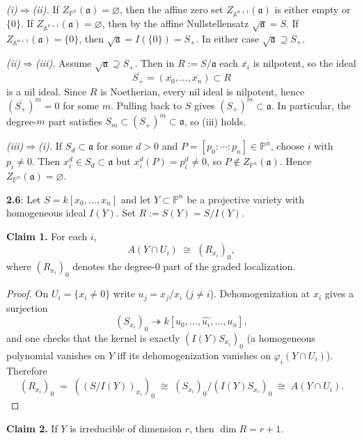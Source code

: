 \documentclass[12pt]{article}
\numberwithin{thm}{subsection}
\numberwithin{defn}{subsection}
\numberwithin{lemma}{subsection}
\numberwithin{example}{subsection}
\numberwithin{notation}{subsection}
\numberwithin{cor}{subsection}
\numberwithin{remark}{subsection}
\numberwithin{condition}{subsection}
\numberwithin{question}{subsection}
\numberwithin{construction}{subsection}
\numberwithin{construction}{subsection}
\numberwithin{construction}{subsection}
\begin{document}
\emph{(i)$\Rightarrow$(ii).}
If $Z_{\mathbb P^n}(\mathfrak a)=\varnothing$, then the affine zero set $Z_{\mathbb A^{n+1}}(\mathfrak a)$
is either empty or $\{0\}$.
If $Z_{\mathbb A^{n+1}}(\mathfrak a)=\varnothing$, then by the affine Nullstellensatz $\sqrt{\mathfrak a}=S$.
If $Z_{\mathbb A^{n+1}}(\mathfrak a)=\{0\}$, then $\sqrt{\mathfrak a}=I(\{0\})=S_+$.
In either case $\sqrt{\mathfrak a}\supseteq S_+$.

\emph{(ii)$\Rightarrow$(iii).}
Assume $\sqrt{\mathfrak a}\supseteq S_+$.
Then in $R:=S/\mathfrak a$ each $\overline{x_i}$ is nilpotent, so the ideal
\[
\overline{S_+}=(\overline{x_0},\dots,\overline{x_n})\subset R
\]
is a nil ideal.
Since $R$ is Noetherian, every nil ideal is nilpotent, hence $(\overline{S_+})^m=0$ for some $m$.
Pulling back to $S$ gives $(S_+)^m\subset \mathfrak a$.
In particular, the degree-$m$ part satisfies $S_m\subset (S_+)^m\subset \mathfrak a$, so (iii) holds.

\emph{(iii)$\Rightarrow$(i).}
If $S_d\subset \mathfrak a$ for some $d>0$ and $P=[p_0:\cdots:p_n]\in \mathbb P^n$,
choose $i$ with $p_i\neq 0$.
Then $x_i^d\in S_d\subset \mathfrak a$ but $x_i^d(P)=p_i^d\neq 0$, so $P\notin Z_{\mathbb P^n}(\mathfrak a)$.
Hence $Z_{\mathbb P^n}(\mathfrak a)=\varnothing$.


\bigskip

\textbf{2.6}:
Let $S=k[x_0,\dots,x_n]$ and let $Y\subset \mathbb P^n$ be a projective variety with homogeneous ideal $I(Y)$.
Set $R:=S(Y)=S/I(Y)$.

\medskip
\textbf{Claim 1.} For each $i$,
\[
A(Y\cap U_i)\;\cong\; (R_{x_i})_0,
\]
where $(R_{x_i})_0$ denotes the degree-$0$ part of the graded localization.

\begin{proof}
On $U_i=\{x_i\neq 0\}$ write $u_j=x_j/x_i$ ($j\neq i$). Dehomogenization at $x_i$ gives a surjection
\[
(S_{x_i})_0 \twoheadrightarrow k[u_0,\dots,\widehat{u_i},\dots,u_n],
\]
and one checks that the kernel is exactly $(I(Y)S_{x_i})_0$ (a homogeneous polynomial vanishes on $Y$ iff its
dehomogenization vanishes on $\varphi_i(Y\cap U_i)$).
Therefore
\[
(R_{x_i})_0 \;=\; ((S/I(Y))_{x_i})_0 \;\cong\; (S_{x_i})_0/(I(Y)S_{x_i})_0 \;\cong\; A(Y\cap U_i).
\]
\end{proof}

\medskip
\textbf{Claim 2.} If $Y$ is irreducible of dimension $r$, then $\dim R=r+1$.
\end{document}
